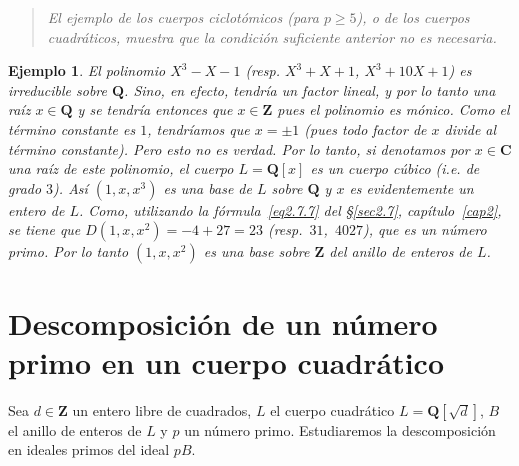 \documentclass[bibtotoc,leqno,spanish]{amsbook}
\newcommand{\QQ}{\mathbf{Q}}
\newcommand{\ZZ}{\mathbf{Z}}
\newcommand{\CC}{\mathbf{C}}
\numberwithin{equation}{section}
\newenvironment{comm}%
	{\begin{quotation}\itshape\Small}
	{\end{quotation}}
\theoremstyle{note}
\theoremstyle{note}
\theoremstyle{rem}
\newtheorem*{example*}{Ejemplo}
\numberwithin{theorem}{section}
\numberwithin{proposition}{section}
\numberwithin{definition}{section}
\numberwithin{lemma}{section}
\numberwithin{corollary}{section}
\numberwithin{example}{section}
\numberwithin{footnote}{section}%
\begin{document}
\begin{comm}
El ejemplo de los cuerpos ciclot\'omicos (para $p\geq 5$), o de los cuerpos cuadr\'aticos, muestra que
la condici\'on suficiente anterior no es necesaria.
\end{comm}

\begin{example*}
El polinomio $X^{3}-X-1$ (resp. $X^{3}+X+1$, $X^{3}+10X+1$) es {\em irreducible} sobre $\QQ$.
Sino, en efecto, tendr\'ia un factor lineal, y por lo tanto una ra\'iz $x\in\QQ$ y se tendr\'ia entonces
que $x\in\ZZ$ pues el polinomio es m\'onico. Como el t\'ermino constante es $1$, tendr\'iamos que
$x=\pm 1$ (pues todo factor de $x$ divide al t\'ermino constante). Pero esto no es verdad. Por lo tanto,
si denotamos por $x\in\CC$ una ra\'iz de este polinomio, el cuerpo $L = \QQ[x]$ es un {\em cuerpo c\'ubico}
(i.e. de grado $3$). As\'i $(1,x,x^{3})$ es una base de $L$ sobre $\QQ$ y $x$ es evidentemente un entero de
$L$. Como, utilizando la f\'ormula~\eqref{eq2.7.7} del \S\ref{sec2.7}, cap\'itulo~\ref{cap2}, se tiene
que $D(1,x,x^{2}) = -4+27 = 23$ (resp.~$31$,~$4027$), que es un n\'umero primo.  Por lo tanto
$(1,x,x^{2})$ es una base sobre $\ZZ$ del anillo de enteros de $L$.
\end{example*}

\section{Descomposici\'on de un n\'umero primo en un cuerpo cuadr\'atico}\label{sec5.4}

Sea $d\in\ZZ$ un entero libre de cuadrados, $L$ el cuerpo cuadr\'atico $L = \QQ[\sqrt{d}]$,
$B$ el anillo de enteros de $L$ y $p$ un n\'umero primo. Estudiaremos la descomposici\'on en ideales
primos del ideal $pB$.
\end{document}
